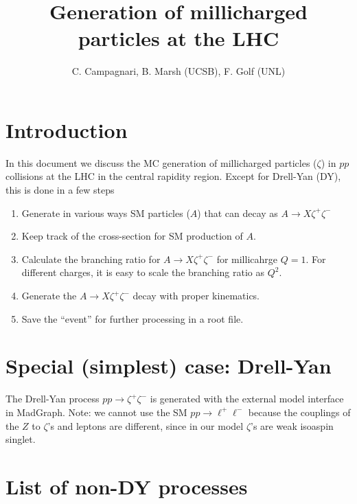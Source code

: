 \documentclass[12pt]{article}
\title{Generation of millicharged particles at the LHC}
\author{C. Campagnari, B. Marsh (UCSB), F. Golf (UNL)}
\begin{document}
\maketitle


\section{Introduction}
In this document we discuss the MC generation of millicharged
particles ($\zeta$) in $pp$ collisions at the LHC in the central rapidity
region. 
Except for Drell-Yan (DY), this is done in a few steps
\begin{enumerate}
\item Generate in various ways SM particles ($A$) that can decay as
  $A \to X \zeta^+ \zeta^-$
\item Keep track of the cross-section for SM production of $A$.
\item Calculate the branching ratio for $A \to X \zeta^+ \zeta^-$
  for millicahrge $Q=1$.  For different charges, it is easy to
  scale the branching ratio as $Q^2$.
\item Generate the $A \to X \zeta^+ \zeta^-$ decay with proper
  kinematics.
\item Save the ``event'' for further processing in a root file.
  \end{enumerate}
  


\section{Special (simplest) case: Drell-Yan}
The Drell-Yan process $pp \to \zeta^+ \zeta^-$ is generated with
the external model interface in MadGraph.  Note: we cannot use
the SM $pp \to \ell^+ \ell^-$ because the couplings of the $Z$ to
$\zeta$'s and leptons are different, since in our model $\zeta$'s
are weak isoaspin singlet.




\section{List of non-DY processes}
\end{document}
